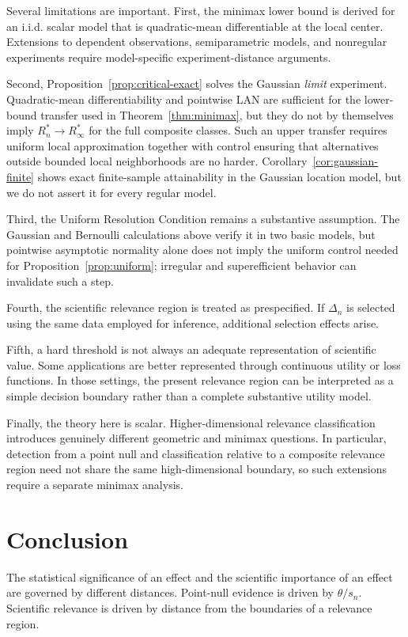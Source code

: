 \documentclass[11pt]{article}
\theoremstyle{remark}
\begin{document}
Several limitations are important. First, the minimax lower bound is derived for an i.i.d. scalar model that is quadratic-mean differentiable at the local center. Extensions to dependent observations, semiparametric models, and nonregular experiments require model-specific experiment-distance arguments.

Second, Proposition~\ref{prop:critical-exact} solves the Gaussian \emph{limit} experiment. Quadratic-mean differentiability and pointwise LAN are sufficient for the lower-bound transfer used in Theorem~\ref{thm:minimax}, but they do not by themselves imply $R_n^*\to R_\infty^*$ for the full composite classes. Such an upper transfer requires uniform local approximation together with control ensuring that alternatives outside bounded local neighborhoods are no harder. Corollary~\ref{cor:gaussian-finite} shows exact finite-sample attainability in the Gaussian location model, but we do not assert it for every regular model.

Third, the Uniform Resolution Condition remains a substantive assumption. The Gaussian and Bernoulli calculations above verify it in two basic models, but pointwise asymptotic normality alone does not imply the uniform control needed for Proposition~\ref{prop:uniform}; irregular and superefficient behavior can invalidate such a step.

Fourth, the scientific relevance region is treated as prespecified. If $\Delta_n$ is selected using the same data employed for inference, additional selection effects arise.

Fifth, a hard threshold is not always an adequate representation of scientific value. Some applications are better represented through continuous utility or loss functions. In those settings, the present relevance region can be interpreted as a simple decision boundary rather than a complete substantive utility model.

Finally, the theory here is scalar. Higher-dimensional relevance classification introduces genuinely different geometric and minimax questions. In particular, detection from a point null and classification relative to a composite relevance region need not share the same high-dimensional boundary, so such extensions require a separate minimax analysis.

\section{Conclusion}

The statistical significance of an effect and the scientific importance of an effect are governed by different distances. Point-null evidence is driven by $\theta/s_n$. Scientific relevance is driven by distance from the boundaries of a relevance region.
\end{document}
